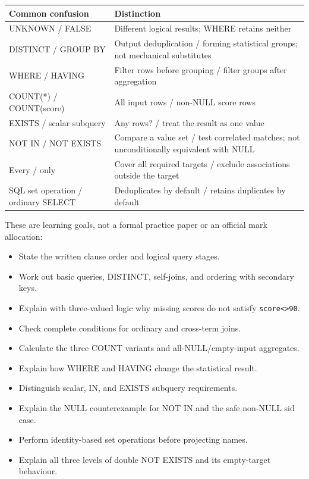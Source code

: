 \begin{longtable}[]{@{}
  >{\raggedright\arraybackslash}p{}
  >{\raggedright\arraybackslash}p{}@{}}
\toprule\noalign{}
\begin{minipage}[b]{\linewidth}\raggedright
Common confusion
\end{minipage} & \begin{minipage}[b]{\linewidth}\raggedright
Distinction
\end{minipage} \\
\midrule\noalign{}
\endhead
\bottomrule\noalign{}
\endlastfoot
UNKNOWN / FALSE & Different logical results; WHERE retains neither \\
DISTINCT / GROUP BY & Output deduplication / forming statistical groups; not mechanical substitutes \\
WHERE / HAVING & Filter rows before grouping / filter groups after aggregation \\
COUNT(*) / COUNT(score) & All input rows / non-NULL score rows \\
EXISTS / scalar subquery & Any rows? / treat the result as one value \\
NOT IN / NOT EXISTS & Compare a value set / test correlated matches; not unconditionally equivalent with NULL \\
Every / only & Cover all required targets / exclude associations outside the target \\
SQL set operation / ordinary SELECT & Deduplicates by default / retains duplicates by default \\
\end{longtable}

These are learning goals, not a formal practice paper or an official mark allocation:

\begin{itemize}
\tightlist
\item[$\square$]
  State the written clause order and logical query stages.
\item[$\square$]
  Work out basic queries, DISTINCT, self-joins, and ordering with secondary keys.
\item[$\square$]
  Explain with three-valued logic why missing scores do not satisfy \texttt{score\textless{}\textgreater{}90}.
\item[$\square$]
  Check complete conditions for ordinary and cross-term joins.
\item[$\square$]
  Calculate the three COUNT variants and all-NULL/empty-input aggregates.
\item[$\square$]
  Explain how WHERE and HAVING change the statistical result.
\item[$\square$]
  Distinguish scalar, IN, and EXISTS subquery requirements.
\item[$\square$]
  Explain the NULL counterexample for NOT IN and the safe non-NULL sid case.
\item[$\square$]
  Perform identity-based set operations before projecting names.
\item[$\square$]
  Explain all three levels of double NOT EXISTS and its empty-target behaviour.
\end{itemize}

